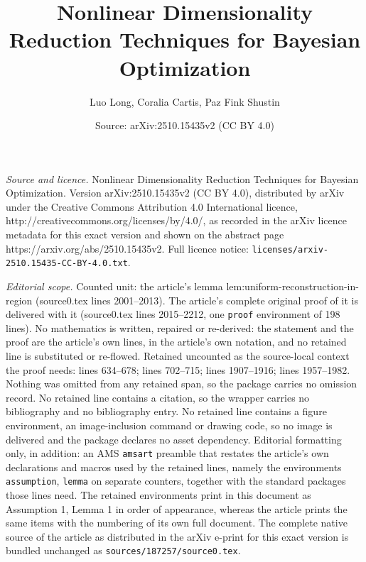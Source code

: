 \documentclass[10pt,a4paper]{amsart}
\title{Nonlinear Dimensionality Reduction Techniques for Bayesian Optimization}
\author{Luo Long, Coralia Cartis, Paz Fink Shustin}
\date{Source: arXiv:2510.15435v2 (CC BY 4.0)}
\begin{document}
\maketitle

\noindent\emph{Source and licence.} Nonlinear Dimensionality Reduction Techniques for Bayesian Optimization. Version arXiv:2510.15435v2 (CC BY 4.0), distributed by arXiv under the Creative Commons Attribution 4.0 International licence, http://creativecommons.org/licenses/by/4.0/, as recorded in the arXiv licence metadata for this exact version and shown on the abstract page https://arxiv.org/abs/2510.15435v2. Full licence notice: \texttt{licenses/arxiv-2510.15435-CC-BY-4.0.txt}.\par\smallskip

\noindent\textit{Editorial scope.} Counted unit: the article's lemma lem:uniform-reconstruction-in-region (source0.tex lines 2001--2013). The article's complete original proof of it is delivered with it (source0.tex lines 2015--2212, one \texttt{proof} environment of 198 lines). No mathematics is written, repaired or re-derived: the statement and the proof are the article's own lines, in the article's own notation, and no retained line is substituted or re-flowed.  Retained uncounted as the source-local context the proof needs: lines 634--678; lines 702--715; lines 1907--1916; lines 1957--1982.  Nothing was omitted from any retained span, so the package carries no omission record.  No retained line contains a citation, so the wrapper carries no bibliography and no bibliography entry.  No retained line contains a figure environment, an image-inclusion command or drawing code, so no image is delivered and the package declares no asset dependency.  Editorial formatting only, in addition: an AMS \texttt{amsart} preamble that restates the article's own declarations and macros used by the retained lines, namely the environments \texttt{assumption}, \texttt{lemma} on separate counters, together with the standard packages those lines need.  The retained environments print in this document as Assumption 1, Lemma 1 in order of appearance, whereas the article prints the same items with the numbering of its own full document.  The complete native source of the article as distributed in the arXiv e-print for this exact version is bundled unchanged as \texttt{sources/187257/source0.tex}.
\end{document}
